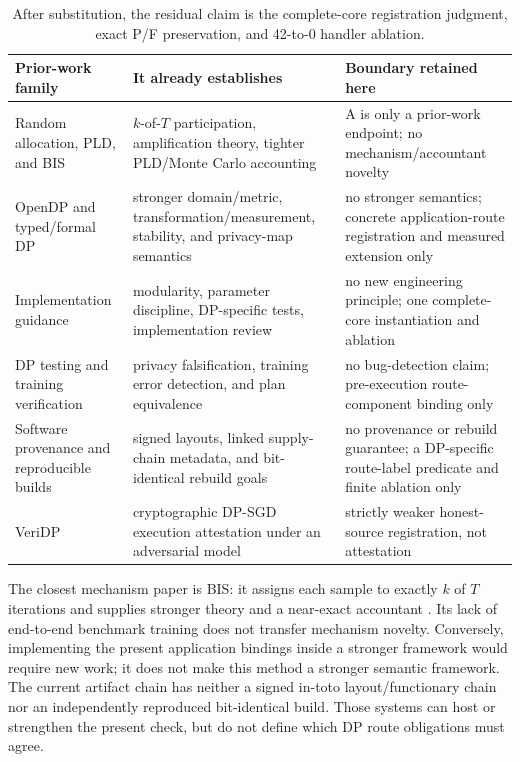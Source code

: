 \documentclass[letterpaper]{article}
\begin{document}
\begin{table}[t]
\centering
\scriptsize
\setlength{\tabcolsep}{4pt}
\begin{tabular}{@{}p{}p{}p{}@{}}
\toprule
Prior-work family & It already establishes & Boundary retained here \\
\midrule
Random allocation, PLD, and BIS
\citep{shenfeld2025randomallocation,feldman2026efficientallocation,
dong2026lessrandom} &
$k$-of-$T$ participation, amplification theory, tighter PLD/Monte Carlo
accounting &
A is only a prior-work endpoint; no mechanism/accountant novelty \\
OpenDP and typed/formal DP \citep{hay2020opendp} &
stronger domain/metric, transformation/measurement, stability, and privacy-map
semantics &
no stronger semantics; concrete application-route registration and measured
extension only \\
Implementation guidance \citep{kifer2020guidelines} &
modularity, parameter discipline, DP-specific tests, implementation review &
no new engineering principle; one complete-core instantiation and ablation \\
DP testing and training verification
\citep{zhang2020dpcheck,kong2024dpauditorium,cebere2026recordplay,
jiang2025training,lu2025trainverify} &
privacy falsification, training error detection, and plan equivalence &
no bug-detection claim; pre-execution route-component binding only \\
Software provenance and reproducible builds
\citep{torresarias2019intoto,lamb2022reproducible} &
signed layouts, linked supply-chain metadata, and bit-identical rebuild goals &
no provenance or rebuild guarantee; a DP-specific route-label predicate and
finite ablation only \\
VeriDP \citep{abdolmaleki2026veridp} &
cryptographic DP-SGD execution attestation under an adversarial model &
strictly weaker honest-source registration, not attestation \\
\bottomrule
\end{tabular}
\caption{After substitution, the residual claim is the complete-core
registration judgment, exact P/F preservation, and 42-to-0 handler ablation.}
\label{tab:supp-ownership}
\end{table}

The closest mechanism paper is BIS: it assigns each sample to exactly $k$ of
$T$ iterations and supplies stronger theory and a near-exact accountant
\citep{dong2026lessrandom}.  Its lack of end-to-end benchmark training does
not transfer mechanism novelty.  Conversely, implementing the present
application bindings inside a stronger framework would require new work; it
does not make this method a stronger semantic framework.
The current artifact chain has neither a signed in-toto layout/functionary
chain nor an independently reproduced bit-identical build.  Those systems can
host or strengthen the present check, but do not define which DP route
obligations must agree.
\end{document}
